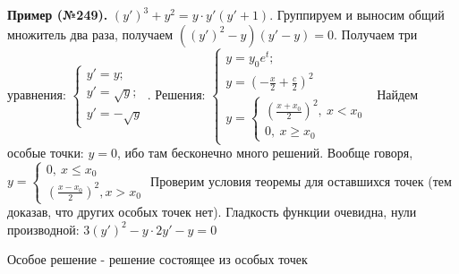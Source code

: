 \textbf{Пример (№249).} $(y')^3+y^2=y\cdot y'(y'+1)$. Группируем и выносим
общий множитель два раза, получаем $((y')^2-y)(y'-y)=0$. 
Получаем три уравнения: 
$\begin{cases}y'=y;\\y'=\sqrt{y};\\y'=-\sqrt{y}\end{cases}$. Решения:
$\begin{cases}y=y_0e^t;\\y=\left( -\frac{x}{2}+\frac{c}{2}\right)^2 \\
y=\begin{cases}\left( \frac{x+x_0}{2} \right)^2,~x<x_0\\0,~x\geqslant x_0
    
\end{cases}  
\end{cases}$
Найдем особые точки: $y=0$, ибо там бесконечно много решений.
Вообще говоря, 
 $y=\begin{cases}0,~x\leqslant x_0\\\left( \frac{x-x_0}{2} \right)^2,x>x_0
  
 \end{cases}$
Проверим условия теоремы для оставшихся точек (тем доказав, что других особых 
точек нет). Гладкость функции очевидна, нули производной:
$3(y')^2-y\cdot 2y'-y=0$

\begin{defin}
Особое решение - решение состоящее из особых точек
\end{defin}
